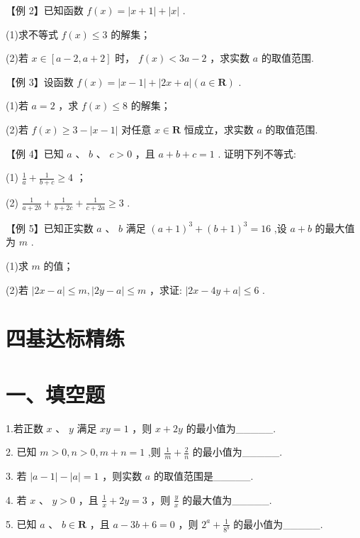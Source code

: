 【例 2】已知函数 $f\left( x\right)  = \left| {x + 1}\right|  + \left| x\right|$ .

(1)求不等式 $f\left( x\right)  \leq  3$ 的解集；

(2)若 $x \in  \left\lbrack  {a - 2,a + 2}\right\rbrack$ 时， $f\left( x\right)  < {3a} - 2$ ，求实数 $a$ 的取值范围.

【例 3】设函数 $f\left( x\right)  = \left| {x - 1}\right|  + \left| {{2x} + a}\right| \left( {a \in  \mathbf{R}}\right)$ .

(1)若 $a = 2$ ，求 $f\left( x\right)  \leq  8$ 的解集；

(2)若 $f\left( x\right)  \geq  3 - \left| {x - 1}\right|$ 对任意 $x \in  \mathbf{R}$ 恒成立，求实数 $a$ 的取值范围.

【例 4】已知 $a$ 、 $b$ 、 $c > 0$ ，且 $a + b + c = 1$ . 证明下列不等式:

(1) $\frac{1}{a} + \frac{1}{b + c} \geq  4$ ；

(2) $\frac{1}{a + {2b}} + \frac{1}{b + {2c}} + \frac{1}{c + {2a}} \geq  3$ .

【例 5】已知正实数 $a\text{ 、 }b$ 满足 ${\left( a + 1\right) }^{3} + {\left( b + 1\right) }^{3} = {16}$ ,设 $a + b$ 的最大值为 $m$ .

(1)求 $m$ 的值；

(2)若 $\left| {{2x} - a}\right|  \leq  m,\left| {{2y} - a}\right|  \leq  m$ ，求证: $\left| {{2x} - {4y} + a}\right|  \leq  6$ .

\section*{四基达标精练}

\section*{一、填空题}

1.若正数 $x\text{ 、 }y$ 满足 ${xy} = 1$ ，则 $x + {2y}$ 的最小值为\_\_\_\_\_.

2. 已知 $m > 0,n > 0,m + n = 1$ ,则 $\frac{1}{m} + \frac{2}{n}$ 的最小值为\_\_\_\_\_.

3. 若 $\left| {a - 1}\right|  - \left| a\right|  = 1$ ，则实数 $a$ 的取值范围是\_\_\_\_\_.

4. 若 $x$ 、 $y > 0$ ，且 $\frac{1}{x} + {2y} = 3$ ，则 $\frac{y}{x}$ 的最大值为\_\_\_\_\_.

5. 已知 $a$ 、 $b \in  \mathbf{R}$ ，且 $a - {3b} + 6 = 0$ ，则 ${2}^{a} + \frac{1}{{8}^{b}}$ 的最小值为\_\_\_\_\_.

